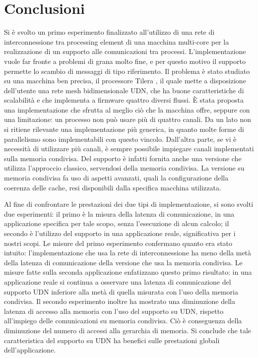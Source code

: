 \section{Conclusioni}
\label{sct:conclusioni}

Si \`e svolto un primo esperimento finalizzato all'utilizzo di una rete di interconnessione tra processing element di una macchina multi-core per la realizzazione di un supporto alle comunicazioni tra processi. L'implementazione vuole far fronte a problemi di grana molto fine, e per questo motivo il supporto permette lo scambio di messaggi di tipo riferimento. Il problema \`e stato studiato su una macchina ben precisa, il processore Tilera \tile, il quale mette a disposizione dell'utente una rete mesh bidimensionale UDN, che ha buone caratteristiche di scalabilit\`a e che implementa a firmware quattro diversi flussi. \`E stata proposta una implementazione che sfrutta al meglio ci\`o che la macchina offre, seppure con una limitazione: un processo non pu\`o usare pi\`u di quattro canali. Da un lato non si ritiene rilevante una implementazione pi\`u generica, in quanto molte forme di parallelismo sono implementabili con questo vincolo. Dall'altra parte, se vi \`e necessit\`a di utilizzare pi\`u canali, \`e sempre possibile impiegare canali implementati sulla memoria condivisa. Del supporto \`e infatti fornita anche una versione che utilizza l'approccio classico, servendosi della memoria condivisa. La versione su memoria condivisa fa uso di aspetti avanzati, quali la configurazione della coerenza delle cache, resi disponibili dalla specifica macchina utilizzata.

Al fine di confrontare le prestazioni dei due tipi di implementazione, si sono svolti due esperimenti: il primo \`e la misura della latenza di comunicazione, in una applicazione specifica per tale scopo, senza l'esecuzione di alcun calcolo; il secondo \`e l'utilizzo del supporto in una applicazione reale, significativa per i nostri scopi. Le misure del primo esperimento confermano quanto era stato intuito: l'implementazione che usa la rete di interconnessione ha meno della met\`a della latenza di comunicazione della versione che usa la memoria condivisa. Le misure fatte sulla seconda applicazione enfatizzano questo primo risultato: in una applicazione reale si continua a osservare una latenza di comunicazione del supporto UDN inferiore alla met\`a di quella misurata con l'uso della memoria condivisa. Il secondo esperimento inoltre ha mostrato una diminuzione della latenza di accesso alla memoria con l'uso del supporto su UDN, rispetto all'impiego delle comunicazioni su memoria condivisa. Ci\`o \`e conseguenza della diminuzione del numero di accessi alla gerarchia di memoria. Si conclude che tale caratteristica del supporto su UDN ha benefici sulle prestazioni globali dell'applicazione.

